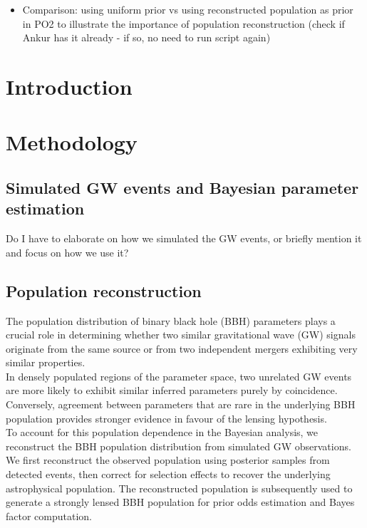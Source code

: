 \documentclass[linenumbers,amsmath,trackchanges]{aastex702}
\begin{document}
\begin{itemize}
    \begin{itemize}
        \item Models used by LeR to calculate rates and by Ankur to simulate GW signals
        \item Hypotheses: intrinsic n-image systems or systems having n images detectable; check Otto's
        prior odds paper, Ankur's PO2 script; can do both and they should give the same conclusion
        \item Check luminosity distance prior used in PO2: Madau and Dickinson for unlensed, lensed 
        population for lensed (again, check intrinsic or detectable)
    \end{itemize}
    \item Comparison: using uniform prior vs using reconstructed population as prior in PO2 to illustrate 
    the importance of population reconstruction (check if Ankur has it already - if so, no need to run 
    script again)
\end{itemize}


\section{Introduction}

\section{Methodology}
\subsection{Simulated GW events and Bayesian parameter estimation}
Do I have to elaborate on how we simulated the GW events, or briefly mention it and focus on how we use it?

\subsection{Population reconstruction}
\label{sec:population_reconstruction}
The population distribution of binary black hole (BBH) parameters plays a crucial role in determining 
whether two similar gravitational wave (GW) signals originate from the same source or from two independent 
mergers exhibiting very similar properties.\\
In densely populated regions of the parameter space, two unrelated GW events are more likely to exhibit 
similar inferred parameters purely by coincidence. Conversely, agreement between parameters that are rare 
in the underlying BBH population provides stronger evidence in favour of the lensing hypothesis.\\
To account for this population dependence in the Bayesian analysis, we reconstruct the BBH population 
distribution from simulated GW observations. We first reconstruct the observed population using posterior 
samples from detected events, then correct for selection effects to recover the underlying astrophysical 
population. The reconstructed population is subsequently used to generate a strongly lensed BBH population 
for prior odds estimation and Bayes factor computation.
\end{document}
